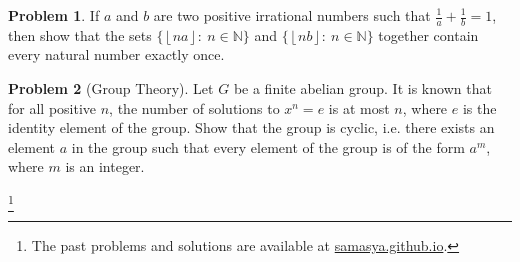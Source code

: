 \documentclass[10pt,a4paper,notitlepage]{article}
\theoremstyle{definition}
\newtheorem{prob}{Problem}
\newcommand\blfootnote[1]{%
  \begingroup
  \renewcommand\thefootnote{}\footnote{#1}%
  \addtocounter{footnote}{-1}%
  \endgroup
}
\begin{document}
\begin{prob}
If $a$ and $b$ are two positive irrational numbers such that $\frac{1}{a} + \frac{1}{b} = 1$, then show that the sets $\{\left \lfloor na \right \rfloor:\ n \in \mathbb{N} \}$ and $\{\left \lfloor nb \right \rfloor:\ n \in \mathbb{N} \}$ together contain every natural number exactly once.
\end{prob}

\begin{prob}[Group Theory]
Let $G$ be a finite abelian group. It is known that for all positive $n$, the number of solutions to $x^n=e$ is at most $n$, where $e$ is the identity element of the group. Show that the group is cyclic, i.e. there exists an element $a$ in the group such that every element of the group is of the form $a^m$, where $m$ is an integer.
\end{prob}

\blfootnote{The past problems and solutions are available at \href{http://samasya.github.io}{samasya.github.io}.}
\end{document}
